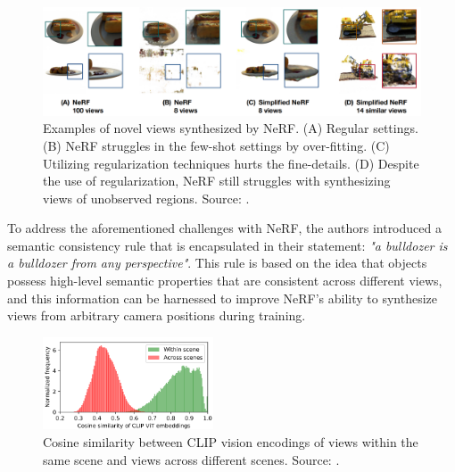 \documentclass{article}
\begin{document}
\begin{figure}[ht!]
    \begin{center}
        \includegraphics[width=1.0\textwidth]{figures/bad_nerf.png}
    \end{center}
    \caption{
        Examples of novel views synthesized by NeRF. (A) Regular settings. (B) NeRF struggles in the few-shot settings by over-fitting. (C) Utilizing regularization techniques hurts the fine-details. (D) Despite the use of regularization, NeRF still struggles with synthesizing views of unobserved regions. Source: \citet{Jain_2021_dietnerf}.
    }
    \label{fig:bad_nerf}
\end{figure}

\medskip
\noindent
To address the aforementioned challenges with NeRF, the authors introduced a semantic consistency rule that is encapsulated in their statement: \emph{"a bulldozer is a bulldozer from any perspective"}. This rule is based on the idea that objects possess high-level semantic properties that are consistent across different views, and this information can be harnessed to improve NeRF's ability to synthesize views from arbitrary camera positions during training. 

\begin{figure}
    \centering
    \vspace{-2mm}
    \includegraphics[width=0.45\textwidth]{figures/similarity_in_view.png}
    \caption{
        Cosine similarity between CLIP vision encodings of views within the same scene and views across different scenes. Source: \citet{Jain_2021_dietnerf}.
    }
    \label{fig:similarity_in_view}
    \vspace{-4mm}
\end{figure}
\end{document}
